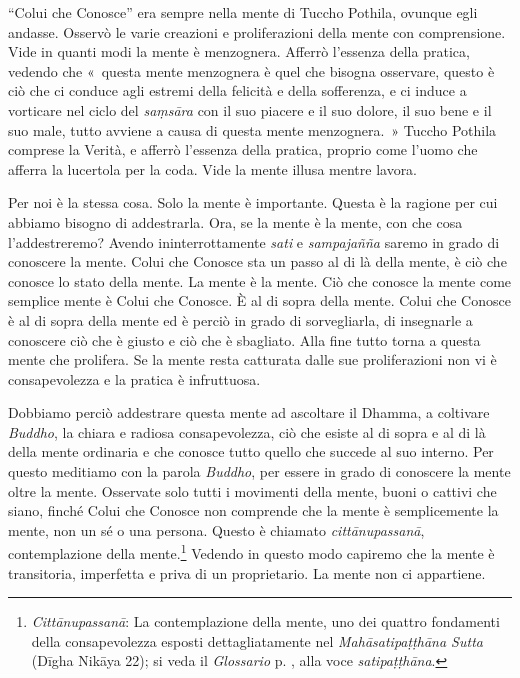``Colui che Conosce'' era sempre nella mente di Tuccho Pothila, ovunque
egli andasse. Osservò le varie creazioni e proliferazioni della mente
con comprensione. Vide in quanti modi la mente è menzognera. Afferrò
l'essenza della pratica, vedendo che «~questa mente menzognera è quel
che bisogna osservare, questo è ciò che ci conduce agli estremi della
felicità e della sofferenza, e ci induce a vorticare nel ciclo del
\emph{saṃsāra} con il suo piacere e il suo dolore, il suo bene e il suo
male, tutto avviene a causa di questa mente menzognera.~» Tuccho Pothila
comprese la Verità, e afferrò l'essenza della pratica, proprio come
l'uomo che afferra la lucertola per la coda. Vide la mente illusa mentre
lavora.

Per noi è la stessa cosa. Solo la mente è importante. Questa è la
ragione per cui abbiamo bisogno di addestrarla. Ora, se la mente è la
mente, con che cosa l'addestreremo? Avendo ininterrottamente \emph{sati}
e \emph{sampajañña} saremo in grado di conoscere la mente. Colui che
Conosce sta un passo al di là della mente, è ciò che conosce lo stato
della mente. La mente è la mente. Ciò che conosce la mente come semplice
mente è Colui che Conosce. È al di sopra della mente. Colui che Conosce
è al di sopra della mente ed è perciò in grado di sorvegliarla, di
insegnarle a conoscere ciò che è giusto e ciò che è sbagliato. Alla fine
tutto torna a questa mente che prolifera. Se la mente resta catturata
dalle sue proliferazioni non vi è consapevolezza e la pratica è
infruttuosa.

Dobbiamo perciò addestrare questa mente ad ascoltare il Dhamma, a
coltivare \emph{Buddho}, la chiara e radiosa consapevolezza, ciò che
esiste al di sopra e al di là della mente ordinaria e che conosce tutto
quello che succede al suo interno. Per questo meditiamo con la parola
\emph{Buddho}, per essere in grado di conoscere la mente oltre la mente.
Osservate solo tutti i movimenti della mente, buoni o cattivi che siano,
finché Colui che Conosce non comprende che la mente è semplicemente la
mente, non un sé o una persona. Questo è chiamato \emph{cittānupassanā},
contemplazione della mente.\footnote{\emph{Cittānupassanā}: La
  contemplazione della mente, uno dei quattro fondamenti della
  consapevolezza esposti dettagliatamente nel
  \emph{Mahāsatipaṭṭhāna Sutta} (Dīgha Nikāya 22); si veda il
  \emph{Glossario} p. \pageref{glossary-satipatthana}, alla voce \emph{satipaṭṭhāna}.} Vedendo in questo
modo capiremo che la mente è transitoria, imperfetta e priva di un
proprietario. La mente non ci appartiene.

